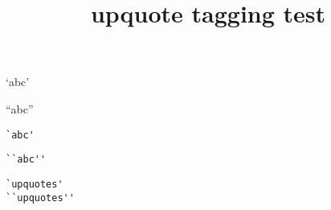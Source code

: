 \documentclass{article}
\title{upquote tagging test}
\begin{document}
`abc'

``abc''

\verb|`abc'|

\verb|``abc''|

\begin{verbatim}
`upquotes'
``upquotes''
\end{verbatim}
\end{document}
